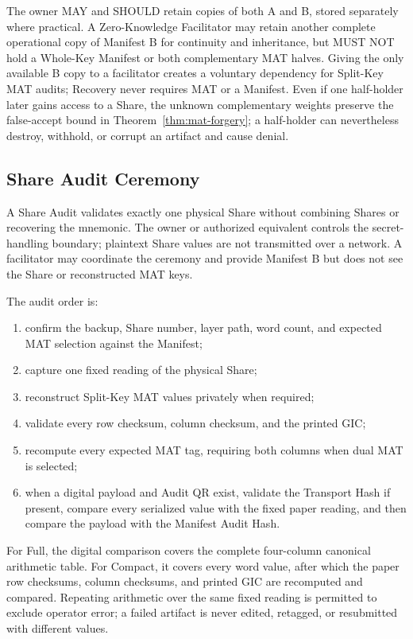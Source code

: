 \documentclass[11pt]{article}
\begin{document}
The owner MAY and SHOULD retain copies of both A and B, stored separately where practical. A Zero-Knowledge Facilitator may retain another complete operational copy of Manifest B for continuity and inheritance, but MUST NOT hold a Whole-Key Manifest or both complementary MAT halves. Giving the only available B copy to a facilitator creates a voluntary dependency for Split-Key MAT audits; Recovery never requires MAT or a Manifest. Even if one half-holder later gains access to a Share, the unknown complementary weights preserve the false-accept bound in Theorem~\ref{thm:mat-forgery}; a half-holder can nevertheless destroy, withhold, or corrupt an artifact and cause denial.

\subsection{Share Audit Ceremony}
\label{sec:share-audit}

A Share Audit validates exactly one physical Share without combining Shares or recovering the mnemonic. The owner or authorized equivalent controls the secret-handling boundary; plaintext Share values are not transmitted over a network. A facilitator may coordinate the ceremony and provide Manifest B but does not see the Share or reconstructed MAT keys.

The audit order is:
\begin{enumerate}[noitemsep]
    \item confirm the backup, Share number, layer path, word count, and expected MAT selection against the Manifest;
    \item capture one fixed reading of the physical Share;
    \item reconstruct Split-Key MAT values privately when required;
    \item validate every row checksum, column checksum, and the printed GIC;
    \item recompute every expected MAT tag, requiring both columns when dual MAT is selected;
    \item when a digital payload and Audit QR exist, validate the Transport Hash if present, compare every serialized value with the fixed paper reading, and then compare the payload with the Manifest Audit Hash.
\end{enumerate}
For Full, the digital comparison covers the complete four-column canonical arithmetic table. For Compact, it covers every word value, after which the paper row checksums, column checksums, and printed GIC are recomputed and compared. Repeating arithmetic over the same fixed reading is permitted to exclude operator error; a failed artifact is never edited, retagged, or resubmitted with different values.
\end{document}
